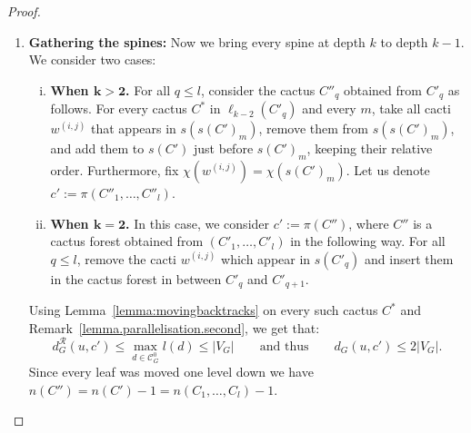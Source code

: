 \documentclass{article}
\begin{document}
\begin{proof}
\begin{enumerate}
As a result of this recursive elimination, $u:= u^{(\tau)}$ can be written as follows:
\[u := \gamma^{(1)} \odot \left(t^{(1)}\right)^{a_1} \odot \gamma^{(2)} \odot \left(t^{(2)}\right)^{a_2} \odot \cdots \odot \gamma^{(m_c)} \odot \left(t^{(m_c)}\right)^{a_{m_c}} \odot \gamma^{(m_c+1)},
\]
where each $t^{(i)}$ is a spine. 

Using Lemma~\ref{lem:comp-distances}, we have:
\[d_G(c,u) \le \tau \alpha_G \log(n) \le |\mathcal{C}_G^0| \left(\alpha_G \log(n)+ \text{diam}(G)\right).\]

Another way to describe $u$ is to say that we have $u = \pi(C'_1,\ldots,C'_l)$ where $(C'_1,\ldots,C'_l)$ is the cactus forest obtained from $(C_1,\ldots,C_l)$ by replacing each leaf $w^{(i)}$ in its $k$-th level by $a_i$ cacti $w^{(i,j)}$, $1 \le j \le a_i$ such that for all $i,j$, $\chi (w^{(i,j)}) = \chi(w^{(i)})$ and $\xi(w^{(i,j)}) = t^{(i)}$.
Figure~\ref{cactus-l} (left) illustrates the transformation of $(C_1,\ldots,C_l)$ into $(C'_1,\ldots,C'_l)$.

\item\textbf{Gathering the spines:} 
Now we bring every spine at depth $k$ to depth $k-1$. We consider two cases: 
\begin{enumerate}[(i)]
    \item \textbf{When $\boldsymbol{k>2}$.} For all $q \le l$, consider the cactus $C''_q$ obtained from $C'_q$ as follows. For every cactus $C^\ast$ in $\ell_{k-2}(C'_q)$ and every $m$, take all cacti $w^{(i,j)}$ that appears in $s(s(C')_m)$, remove them from $s(s(C')_m)$, and add them to $s(C')$ just before $s(C')_m$, keeping their relative order. Furthermore, fix $\chi(w^{(i,j)}) = \chi(s(C')_m)$.
    Let us denote $c' := \pi(C''_1,\ldots,C''_l)$.
    \item \textbf{When $\boldsymbol{k=2}$.} In this case,
    we consider $c' := \pi(C'')$, 
    where $C''$ is a cactus forest obtained from $(C'_1,\ldots,C'_l)$
    in the following way. For all $q \le l$, remove the cacti $w^{(i,j)}$ which appear in $s(C'_q)$ and insert them in the cactus forest in between $C'_q$ and $C'_{q+1}$.
\end{enumerate}

Using Lemma~\ref{lemma:movingbacktracks} on every such cactus $C^\ast$ and Remark~\ref{lemma.parallelisation.second}, we get that:
\[
d^\mathcal{R}_G (u, c') \le \max_{d \in \mathcal{C}_G^0} l(d) \le |V_G|\qquad\text{and thus}\qquad d_G (u, c') \le 2|V_G|.
\]
Since every leaf was moved %
one level down we have $n(C'') = n(C') - 1 = n(C_1, \ldots , C_l) - 1$.


\end{enumerate}
\end{proof}
\end{document}
